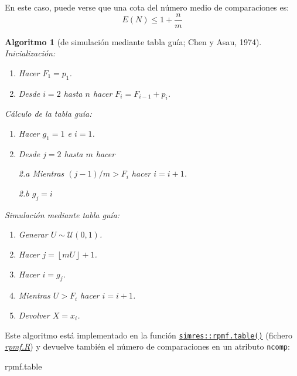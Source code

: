 \documentclass[
]{book}
\newenvironment{Shaded}{\begin{snugshade}}{\end{snugshade}}
\newcommand{\NormalTok}[1]{#1}
\theoremstyle{break}
\newtheorem{conjecture}{Algoritmo}[chapter]
\theoremstyle{nonumberplain}
\begin{document}
En este caso, puede verse que una cota del número medio de comparaciones es:
\[E\left( N\right) \leq 1+\frac{n}{m}\]

\begin{conjecture}[de simulación mediante tabla guía; Chen y Asau, 1974]

Inicialización:

\begin{enumerate}
\def\labelenumi{\arabic{enumi}.}
\item
  Hacer \(F_{1}=p_{1}\).
\item
  Desde \(i=2\) hasta \(n\) hacer \(F_{i}=F_{i-1}+p_{i}\).
\end{enumerate}

Cálculo de la tabla guía:

\begin{enumerate}
\def\labelenumi{\arabic{enumi}.}
\item
  Hacer \(g_{1}=1\) e \(i=1\).
\item
  Desde \(j=2\) hasta \(m\) hacer

  2.a Mientras \((j-1)/m>F_{i}\) hacer \(i=i+1\).

  2.b \(g_{j}=i\)
\end{enumerate}

Simulación mediante tabla guía:

\begin{enumerate}
\def\labelenumi{\arabic{enumi}.}
\item
  Generar \(U\sim \mathcal{U}\left( 0,1\right)\).
\item
  Hacer \(j=\left\lfloor mU\right\rfloor +1\).
\item
  Hacer \(i=g_{j}\).
\item
  Mientras \(U>F_{i}\) hacer \(i=i+1\).
\item
  Devolver \(X=x_{i}\).
\end{enumerate}

\end{conjecture}

Este algoritmo está implementado en la función \href{https://rubenfcasal.github.io/simres/reference/rpmf.table.html}{\texttt{simres::rpmf.table()}} (fichero \href{R/rpmf.R}{\emph{rpmf.R}}) y devuelve también el número de comparaciones en un atributo \texttt{ncomp}:

\begin{Shaded}
\begin{Highlighting}[]
\NormalTok{rpmf.table}
\end{Highlighting}
\end{Shaded}
\end{document}
